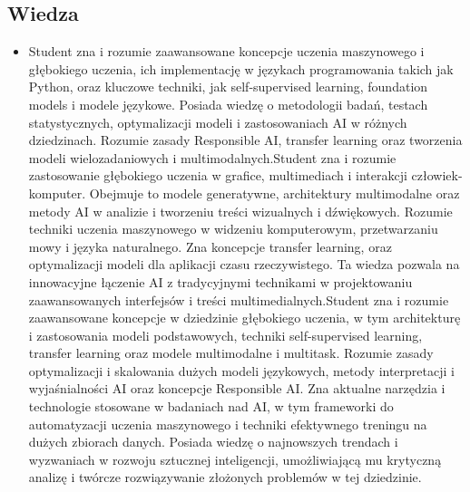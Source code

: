 \documentclass[12pt, a4paper]{article}
\begin{document}
\subsection*{Wiedza}
\begin{itemize}
  \item Student zna i rozumie zaawansowane koncepcje uczenia maszynowego i głębokiego uczenia, ich implementację w językach programowania takich jak Python, oraz kluczowe techniki, jak self-supervised learning, foundation models i modele językowe. Posiada wiedzę o metodologii badań, testach statystycznych, optymalizacji modeli i zastosowaniach AI w różnych dziedzinach. Rozumie zasady Responsible AI, transfer learning oraz tworzenia modeli wielozadaniowych i multimodalnych.Student zna i rozumie zastosowanie głębokiego uczenia w grafice, multimediach i interakcji człowiek-komputer. Obejmuje to modele generatywne, architektury multimodalne oraz metody AI w analizie i tworzeniu treści wizualnych i dźwiękowych. Rozumie techniki uczenia maszynowego w widzeniu komputerowym, przetwarzaniu mowy i języka naturalnego. Zna koncepcje transfer learning, oraz optymalizacji modeli dla aplikacji czasu rzeczywistego. Ta wiedza pozwala na innowacyjne łączenie AI z tradycyjnymi technikami w projektowaniu zaawansowanych interfejsów i treści multimedialnych.Student zna i rozumie zaawansowane koncepcje w dziedzinie głębokiego uczenia, w tym architekturę i zastosowania modeli podstawowych, techniki self-supervised learning, transfer learning oraz modele multimodalne i multitask. Rozumie zasady optymalizacji i skalowania dużych modeli językowych, metody interpretacji i wyjaśnialności AI oraz koncepcje Responsible AI. Zna aktualne narzędzia i technologie stosowane w badaniach nad AI, w tym frameworki do automatyzacji uczenia maszynowego i techniki efektywnego treningu na dużych zbiorach danych. Posiada wiedzę o najnowszych trendach i wyzwaniach w rozwoju sztucznej inteligencji, umożliwiającą mu krytyczną analizę i twórcze rozwiązywanie złożonych problemów w tej dziedzinie.
\end{itemize}
\end{document}

